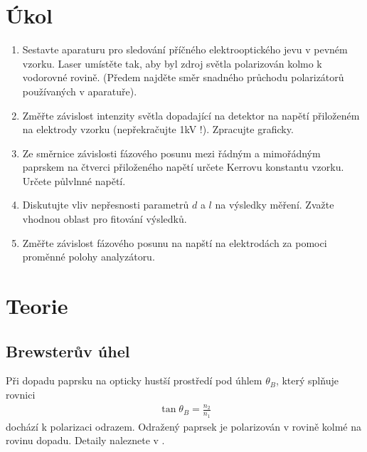 \documentclass[a4paper,12pt]{article}
\begin{document}
\newcommand{\st}{^{\circ}}
\newcommand{\RJ}{\mbox{RJ}}
\newcommand{\mV}{\mbox{m}/\mbox{V}^2}

\section{Úkol}
\begin{enumerate}
    \item Sestavte aparaturu pro sledování příčného elektrooptického jevu v pevném vzorku. Laser umístěte tak, aby byl zdroj světla polarizován kolmo k vodorovné rovině. (Předem najděte směr snadného průchodu polarizátorů používaných v aparatuře).
    \item Změřte závislost intenzity světla dopadající na detektor na napětí přiloženém na elektrody vzorku (nepřekračujte 1kV !). Zpracujte graficky.

    \item Ze směrnice závislosti fázového posunu mezi řádným a mimořádným paprskem na čtverci přiloženého napětí určete Kerrovu konstantu vzorku. Určete půlvlnné napětí.
    \item Diskutujte vliv nepřesnosti parametrů $d$ a $l$ na výsledky měření. Zvažte vhodnou oblast pro fitování výsledků.
    \item Změřte závislost fázového posunu na napští na elektrodách za pomoci proměnné polohy analyzátoru.
\end{enumerate}
 

\section{Teorie}
\subsection{Brewsterův úhel}
Při dopadu paprsku na opticky hustší prostředí pod úhlem $\theta_B$, který splňuje rovnici
\begin{eqnarray}
\tan\theta_B=\frac{n_2}{n_1}
\label{Brew}
\end{eqnarray}
dochází k polarizaci odrazem. Odražený paprsek je polarizován v rovině kolmé na rovinu dopadu. Detaily naleznete v \cite{maly}.
\end{document}
